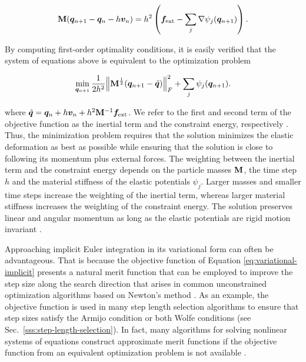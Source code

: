 \begin{equation}\label{eq:implicit-positional-detailed}
    \mathbf{M}(\bm{q}_{n+1} - \bm{q}_n - h\bm{v}_n) = h^2\left(\bm{f_\text{ext}} - \sum_j \nabla \psi_j(\bm{q}_{n+1})\right).
\end{equation}

\noindent By computing first-order optimality conditions, it is easily verified that the system of equations above is equivalent to the optimization 
problem

\begin{equation}\label{eq:variational-implicit}
    \min_{\bm{q}_{n+1}} \frac{1}{2h^2} \norm{\mathbf{M}^{\frac{1}{2}}(\bm{q}_{n+1} - \tilde{\bm{q}})}^2_F + \sum_j \psi_j(\bm{q}_{n+1}).
\end{equation}

\noindent where $\tilde{\bm{q}} = \bm{q}_n + h\bm{v}_n + h^2\mathbf{M}^{-1}\bm{f}_{\text{ext}}$.  
We refer to the first and second term of the objective function as the inertial term and the constraint energy, respectively \cite{bouaziz2014}. 
Thus, the minimization problem requires that the solution minimizes the elastic deformation as best as possible while ensuring that the solution is 
close to following its momentum plus external forces. The weighting between the inertial term and the constraint energy depends on the 
particle masses $\mathbf{M}$, the time step $h$ and the material stiffness of the elastic potentials $\psi_j$. Larger masses and smaller time steps 
increase the weighting of the inertial term, whereas larger material stiffness increases the weighting of the constraint energy. 
The solution preserves linear and angular momentum as long as the elastic potentials are rigid motion invariant \cite{bouaziz2014}.

Approaching implicit Euler integration in its variational form can often be advantageous. That is because the objective function of 
Equation \ref{eq:variational-implicit} presents a natural merit function that can be employed to improve the step size along the search direction 
that arises in common unconstrained optimization algorithms based on Newton's method \cite{nocedal2006}. As an example, the objective 
function is used in many step length selection algorithms to ensure that step sizes satisfy the Armijo condition or both Wolfe conditions 
(see Sec.\ \ref{sss:step-length-selection}). In fact, many algorithms for solving nonlinear systems of equations construct approximate merit functions 
if the objective function from an equivalent optimization problem is not available \cite{nocedal2006}.


